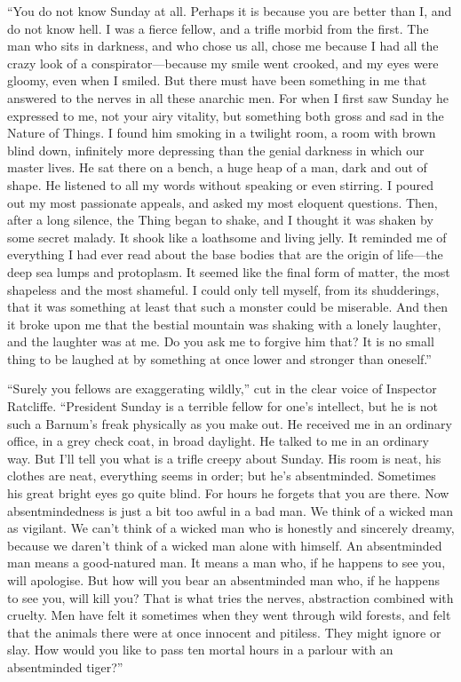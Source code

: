 “You do not know Sunday at all. Perhaps it is because you are better than I, and do not know hell. I was a fierce fellow, and a trifle morbid from the first. The man who sits in darkness, and who chose us all, chose me because I had all the crazy look of a conspirator⁠—because my smile went crooked, and my eyes were gloomy, even when I smiled. But there must have been something in me that answered to the nerves in all these anarchic men. For when I first saw Sunday he expressed to me, not your airy vitality, but something both gross and sad in the Nature of Things. I found him smoking in a twilight room, a room with brown blind down, infinitely more depressing than the genial darkness in which our master lives. He sat there on a bench, a huge heap of a man, dark and out of shape. He listened to all my words without speaking or even stirring. I poured out my most passionate appeals, and asked my most eloquent questions. Then, after a long silence, the Thing began to shake, and I thought it was shaken by some secret malady. It shook like a loathsome and living jelly. It reminded me of everything I had ever read about the base bodies that are the origin of life⁠—the deep sea lumps and protoplasm. It seemed like the final form of matter, the most shapeless and the most shameful. I could only tell myself, from its shudderings, that it was something at least that such a monster could be miserable. And then it broke upon me that the bestial mountain was shaking with a lonely laughter, and the laughter was at me. Do you ask me to forgive him that? It is no small thing to be laughed at by something at once lower and stronger than oneself.”

“Surely you fellows are exaggerating wildly,” cut in the clear voice of Inspector Ratcliffe. “President Sunday is a terrible fellow for one’s intellect, but he is not such a Barnum’s freak physically as you make out. He received me in an ordinary office, in a grey check coat, in broad daylight. He talked to me in an ordinary way. But I’ll tell you what is a trifle creepy about Sunday. His room is neat, his clothes are neat, everything seems in order; but he’s absentminded. Sometimes his great bright eyes go quite blind. For hours he forgets that you are there. Now absentmindedness is just a bit too awful in a bad man. We think of a wicked man as vigilant. We can’t think of a wicked man who is honestly and sincerely dreamy, because we daren’t think of a wicked man alone with himself. An absentminded man means a good-natured man. It means a man who, if he happens to see you, will apologise. But how will you bear an absentminded man who, if he happens to see you, will kill you? That is what tries the nerves, abstraction combined with cruelty. Men have felt it sometimes when they went through wild forests, and felt that the animals there were at once innocent and pitiless. They might ignore or slay. How would you like to pass ten mortal hours in a parlour with an absentminded tiger?”

